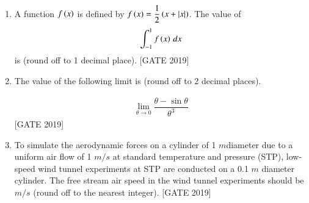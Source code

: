 \documentclass[journal,12pt,onecolumn]{IEEEtran}
\theoremstyle{remark}
\begin{document}
\begin{enumerate}
  \item A function $f\left(x\right)$ is defined by $f\left(x\right) = \dfrac{1}{2}\left(x + |x|\right)$. The value of \begin{align*}
      \int_{-1}^{1} f\left(x\right) \, dx
  \end{align*} is \underline{\hspace{2cm} } (round off to 1 decimal place). \hfill{[GATE 2019]}

    \item The value of the following limit is \underline{\hspace{2cm}}(round off to 2 decimal places).
    
    \begin{align*}
    \lim_{\theta \to 0} \dfrac{\theta - \sin \theta}{\theta^3}
    \end{align*}
    \hfill{[GATE 2019]}
    
    \item To simulate the aerodynamic forces on a cylinder of 1 $m$diameter due to a uniform air flow of 1 $m/s$ at standard temperature and pressure (STP), low-speed wind tunnel experiments at STP are conducted on a 0.1 $m$ diameter cylinder. The free stream air speed in the wind tunnel experiments should be \underline{\hspace{2cm}} $m/s$ (round off to the nearest integer).
    \hfill{[GATE 2019]}
\end{enumerate}
\end{document}
